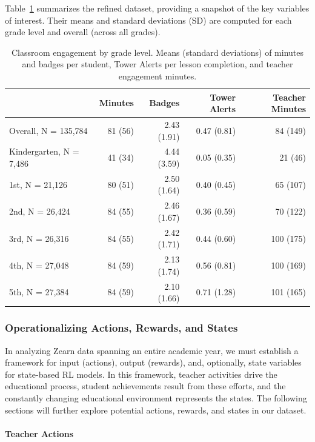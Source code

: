 \documentclass[
  number,
  preprint,
  3p,
  onecolumn]{elsarticle}
\let\oldparagraph\paragraph
\renewcommand{\paragraph}[1]{\oldparagraph{#1}\mbox{}}
\begin{document}
Table~\ref{tbl-classroom-summary} summarizes the refined dataset,
providing a snapshot of the key variables of interest. Their means and
standard deviations (SD) are computed for each grade level and overall
(across all grades).

\begin{longtable}{l|rrrr}

\caption{\label{tbl-classroom-summary}Classroom engagement by grade
level. Means (standard deviations) of minutes and badges per student,
Tower Alerts per lesson completion, and teacher engagement minutes.}

\tabularnewline

\toprule
\multicolumn{1}{l}{} & Minutes & Badges & Tower Alerts & Teacher Minutes \\ 
\midrule\addlinespace[2.5pt]
Overall, N = 135,784 & 81 (56) & 2.43 (1.91) & 0.47 (0.81) & 84 (149) \\ 
Kindergarten, N = 7,486 & 41 (34) & 4.44 (3.59) & 0.05 (0.35) & 21 (46) \\ 
1st, N = 21,126 & 80 (51) & 2.50 (1.64) & 0.40 (0.45) & 65 (107) \\ 
2nd, N = 26,424 & 84 (55) & 2.46 (1.67) & 0.36 (0.59) & 70 (122) \\ 
3rd, N = 26,316 & 84 (55) & 2.42 (1.71) & 0.44 (0.60) & 100 (175) \\ 
4th, N = 27,048 & 84 (59) & 2.13 (1.74) & 0.56 (0.81) & 100 (169) \\ 
5th, N = 27,384 & 84 (59) & 2.10 (1.66) & 0.71 (1.28) & 101 (165) \\ 
\bottomrule

\end{longtable}

\subsubsection{Operationalizing Actions, Rewards, and
States}\label{operationalizing-actions-rewards-and-states}

In analyzing Zearn data spanning an entire academic year, we must
establish a framework for input (actions), output (rewards), and,
optionally, state variables for state-based RL models. In this
framework, teacher activities drive the educational process, student
achievements result from these efforts, and the constantly changing
educational environment represents the states. The following sections
will further explore potential actions, rewards, and states in our
dataset.

\paragraph{Teacher Actions}\label{teacher-actions}
\end{document}
